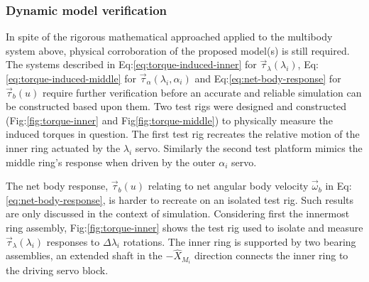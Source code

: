 \subsubsection{Dynamic model verification}
\label{subsubsec:dynamicmodel}
In spite of the rigorous mathematical approached applied to the multibody system above, physical corroboration of the proposed model(s) is still required. The systems described in Eq:\ref{eq:torque-induced-inner} for $\vec{\tau}_\lambda(\lambda_i)$, Eq:\ref{eq:torque-induced-middle} for $\vec{\tau}_\alpha(\lambda_i,\alpha_i)$ and Eq:\ref{eq:net-body-response} for $\vec{\tau}_b(u)$ require further verification before an accurate and reliable simulation can be constructed based upon them. Two test rigs were designed and constructed (Fig:\ref{fig:torque-inner} and Fig\ref{fig:torque-middle}) to physically measure the induced torques in question. The first test rig recreates the relative motion of the inner ring actuated by the $\lambda_i$ servo. Similarly the second test platform mimics the middle ring's response when driven by the outer $\alpha_i$ servo. 
\par
The net body response, $\vec{\tau}_b(u)$ relating to net angular body velocity $\vec{\omega}_b$ in Eq:\ref{eq:net-body-response}, is harder to recreate on an isolated test rig. Such results are only discussed in the context of simulation. Considering first the innermost ring assembly, Fig:\ref{fig:torque-inner} shows the test rig used to isolate and measure $\vec{\tau}_\lambda(\lambda_i)$ responses to $\Delta\lambda_i$ rotations. The inner ring is supported by two bearing assemblies, an extended shaft in the $-\hat{X}_{M_i}$ direction connects the inner ring to the driving servo block.
\par
